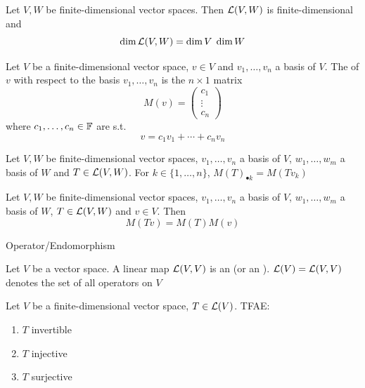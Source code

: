 \documentclass[aspectratio=169]{beamer}
\begin{document}
\begin{frame}
\begin{importanttheorem}[Dimension of $\L(V,W)$]
Let $V,W$ be finite-dimensional vector spaces. Then $\L(V,W)$ is finite-dimensional and 
\[
\dim \mathcal{L}(V,W)=\dim V\; \dim W
\]
\end{importanttheorem}
\end{frame}

\begin{frame}
\begin{definition}
Let $V$ be a finite-dimensional vector space, $v\in V$ and $v_1,\ldots,v_n$ a basis of $V$. The  of $v$ with respect to the basis $v_1,\ldots,v_n$ is the $n\times 1$ matrix
\[
M(v)=\begin{pmatrix}
c_1\\
\vdots\\
c_n
\end{pmatrix}
\]
where $c_1,\ldots,c_n\in\mathbb{F}$ are s.t.
\[
v=c_1v_1+\cdots+c_nv_n
\]
\end{definition}
\begin{theorem}
Let $V,W$ be finite-dimensional vector spaces, $v_1,\ldots,v_n$ a basis of $V$, $w_1,\ldots,w_m$ a basis of $W$ and $T\in\mathcal{L}(V,W)$. For $k\in\{1,\ldots,n\}$, $M(T)_{\bullet k}=M(Tv_k)$
\end{theorem}
\end{frame}

\begin{frame}
\begin{theorem}
Let $V,W$ be finite-dimensional vector spaces, $v_1,\ldots,v_n$ a basis of $V$, $w_1,\ldots,w_m$ a basis of $W$, $T\in\mathcal{L}(V,W)$ and $v\in V$. Then
\[
M(Tv)=M(T)M(v)
\]
\end{theorem}
\end{frame}

\begin{frame}{Operator/Endomorphism}
\begin{definition}
    Let $V$ be a vector space. A linear map $\mathcal{L}(V,V)$ is an  (or an ). $\mathcal{L}(V)=\mathcal{L}(V,V)$ denotes the set of all operators on $V$
\end{definition}
\vfill
\begin{importanttheorem}
Let $V$ be a finite-dimensional vector space, $T\in\mathcal{L}(V)$. TFAE:
\begin{enumerate}
\item $T$ invertible
\item $T$ injective
\item $T$ surjective
\end{enumerate}
\end{importanttheorem}
\end{frame}
\end{document}
